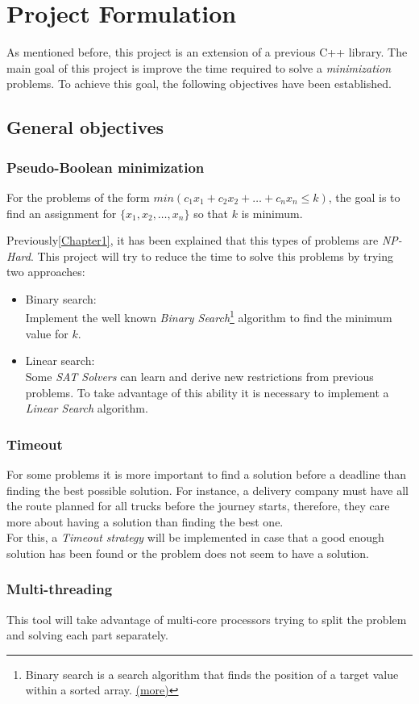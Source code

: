 \chapter{Project Formulation} %

\label{Chapter2} %

As mentioned before, this project is an extension of a previous C++ library. The main goal of this project is improve the time required to solve a \emph{minimization} problems. To achieve this goal, the following objectives have been established. 

\section{General objectives}

\subsection{Pseudo-Boolean minimization}
For the problems of the form $min(c_{1}x_{1}+c_{2}x_{2}+\ldots +c_{n}x_{n} \leq k)$, the goal is to find an assignment for $\{x_{1},x_{2},\ldots,x_{n}\}$ so that $k$ is minimum.

Previously\ref{Chapter1}, it has been explained that this types of problems are \emph{NP-Hard}. This project will try to reduce the time to solve this problems by trying two approaches:
\begin{itemize}
	\item Binary search:\\
		Implement the well known \emph{Binary Search}\footnote{Binary search is a search algorithm that finds the position of a target value within a sorted array. \href{https://en.wikipedia.org/wiki/Binary_search_algorithm}{(more)}} algorithm to find the minimum value for $k$.
	\item Linear search:\\
		Some \emph{SAT Solvers} can learn and derive new restrictions from previous problems. To take advantage of this ability it is necessary to implement a \emph{Linear Search} algorithm.
\end{itemize}

\subsection{Timeout}
For some problems it is more important to find a solution before a deadline than finding the best possible solution. For instance, a delivery company must have all the route planned for all trucks before the journey starts, therefore, they care more about having a solution than finding the best one.\\
For this, a \emph{Timeout strategy} will be implemented in case that a good enough solution has been found or the problem does not seem to have a solution. 
\subsection{Multi-threading}
This tool will take advantage of multi-core processors trying to split the problem and solving each part separately.
